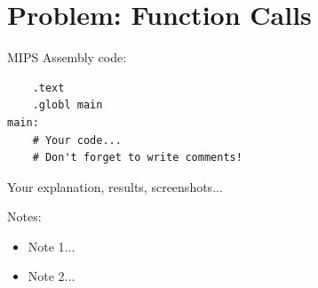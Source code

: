 \documentclass[11pt]{article}
\begin{document}
\section{Problem: Function Calls}

MIPS Assembly code:
\begin{lstlisting}
	.text
	.globl main
main:
    # Your code...
    # Don't forget to write comments!

\end{lstlisting}

Your explanation, results, screenshots...
\newline

Notes: 
\begin{itemize}
    \item {Note 1...}
    \item {Note 2...}
\end{itemize}
\end{document}
